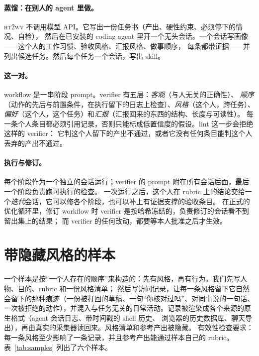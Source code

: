 \documentclass[10pt,UTF8,scheme=plain]{ctexart}
\newcommand{\sys}{\textsc{ht2wv}}
\begin{document}
\paragraph{蒸馏：在别人的 agent 里做。} \sys{} 不调用模型 API。它写出一份任务书（产出、硬性约束、必须停下的情况、自检），
然后在已安装的 coding agent 里开一个无头会话。一个会话写画像——这个人的工作习惯、验收风格、汇报风格、做事顺序，
每条都带证据——并列出候选任务。然后每个任务一个会话，写出 skill。

\paragraph{这一对。} workflow 是一串阶段 prompt。verifier 有五层：\emph{客观}（与人无关的正确性）、
\emph{顺序}（动作的先后与前置条件，在执行留下的日志上检查）、\emph{风格}（这个人，跨任务）、
\emph{偏好}（这个人，这个任务）和\emph{汇报}（汇报回来的东西的结构、长度与可读性）。
每一条个人条目都必须引用记录，否则只能标成低置信度的假设。lint 这一步会拒绝这样的 verifier：
它判这个人留下的产出不通过，或者它没有任何条目能判这个人丢弃的产出不通过。

\paragraph{执行与修订。} 每个阶段作为一个独立的会话运行；verifier 的 prompt 附在所有会话后面，最后一个阶段负责跑可执行的检查。
一次运行之后，这个人在 rubric 上的结论交给一个\emph{迭代}会话，它可以修各个阶段，也可以补上有证据支撑的验收条目。
在正式的优化循环里，修订 workflow 时 verifier 是按哈希冻结的，负责修订的会话看不到留出集上的结果；
而 verifier 的任何改动，都要等本人批准之后才生效。

\section{带隐藏风格的样本}
\label{sec:bench}

一个样本是按“一个人存在的顺序”来构造的：先有风格，再有行为。我们先写人物、目的、rubric 和一份风格清单；
然后写访问记录，让每一条风格留下它自然会留下的那种痕迹（一份被打回的草稿、一句“你核对过吗”、对同事说的一句话、
一次被拒绝的动作），并混入与任务无关的日常活动。记录被渲染成各个来源的原生格式（agent 会话日志、带时间戳的 shell 历史、
浏览器的历史数据库、聊天导出），再由真实的采集器读回来。风格清单和参考产出被隐藏。
有效性检查要求：每一条风格至少影响了一条记录，并且参考产出能通过样本自己的 rubric。表~\ref{tab:samples} 列出了六个样本。
\end{document}
